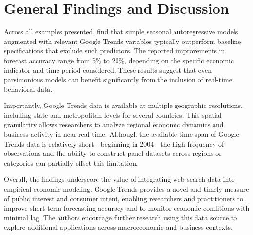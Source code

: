 \documentclass{article}
\begin{document}
\section{General Findings and Discussion}

Across all examples presented, \textcite{ChoiVarian2012} find that simple seasonal autoregressive models augmented with relevant Google Trends variables typically outperform baseline specifications that exclude such predictors. 
The reported improvements in forecast accuracy range from 5\% to 20\%, depending on the specific economic indicator and time period considered. 
These results suggest that even parsimonious models can benefit significantly from the inclusion of real-time behavioral data.

Importantly, Google Trends data is available at multiple geographic resolutions, including state and metropolitan levels for several countries. 
This spatial granularity allows researchers to analyze regional economic dynamics and business activity in near real time. 
Although the available time span of Google Trends data is relatively short—beginning in 2004—the high frequency of observations and the ability to construct panel datasets across regions or categories can partially offset this limitation.

Overall, the findings underscore the value of integrating web search data into empirical economic modeling. 
Google Trends provides a novel and timely measure of public interest and consumer intent, enabling researchers and practitioners to improve short-term forecasting accuracy and to monitor economic conditions with minimal lag. 
The authors encourage further research using this data source to explore additional applications across macroeconomic and business contexts.
\end{document}
